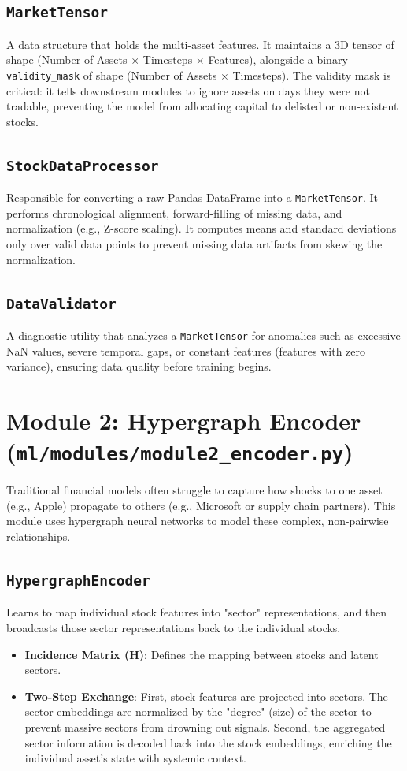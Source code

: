 \documentclass[12pt,a4paper]{report}
\begin{document}
\subsection{\texttt{MarketTensor}}
A data structure that holds the multi-asset features. It maintains a 3D tensor of shape (Number of Assets $\times$ Timesteps $\times$ Features), alongside a binary \texttt{validity\_mask} of shape (Number of Assets $\times$ Timesteps). The validity mask is critical: it tells downstream modules to ignore assets on days they were not tradable, preventing the model from allocating capital to delisted or non-existent stocks.

\subsection{\texttt{StockDataProcessor}}
Responsible for converting a raw Pandas DataFrame into a \texttt{MarketTensor}. It performs chronological alignment, forward-filling of missing data, and normalization (e.g., Z-score scaling). It computes means and standard deviations only over valid data points to prevent missing data artifacts from skewing the normalization.

\subsection{\texttt{DataValidator}}
A diagnostic utility that analyzes a \texttt{MarketTensor} for anomalies such as excessive NaN values, severe temporal gaps, or constant features (features with zero variance), ensuring data quality before training begins.

\section{Module 2: Hypergraph Encoder (\texttt{ml/modules/module2\_encoder.py})}
Traditional financial models often struggle to capture how shocks to one asset (e.g., Apple) propagate to others (e.g., Microsoft or supply chain partners). This module uses hypergraph neural networks to model these complex, non-pairwise relationships.

\subsection{\texttt{HypergraphEncoder}}
Learns to map individual stock features into "sector" representations, and then broadcasts those sector representations back to the individual stocks.
\begin{itemize}
    \item \textbf{Incidence Matrix (H)}: Defines the mapping between stocks and latent sectors.
    \item \textbf{Two-Step Exchange}: First, stock features are projected into sectors. The sector embeddings are normalized by the "degree" (size) of the sector to prevent massive sectors from drowning out signals. Second, the aggregated sector information is decoded back into the stock embeddings, enriching the individual asset's state with systemic context.
\end{itemize}
\end{document}
